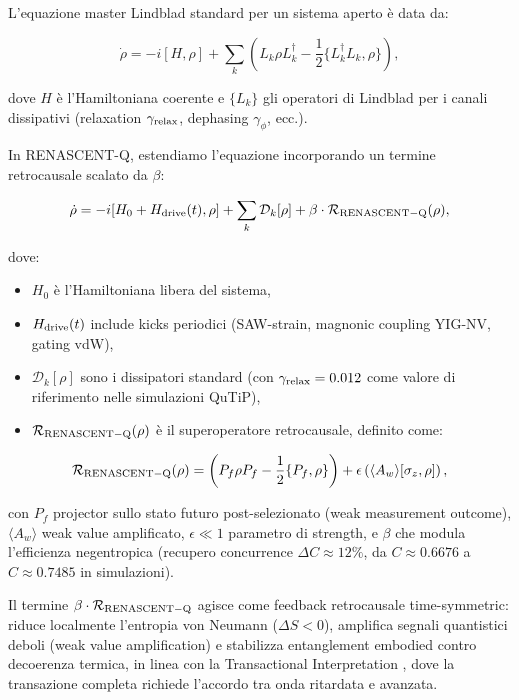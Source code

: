 \documentclass[11pt,a4paper]{article}
\let\oldcite\cite
\renewcommand{\cite}{\protect\oldcite}
\theoremstyle{plain}
\theoremstyle{definition}
\begin{document}
L'equazione master Lindblad standard per un sistema aperto è data da:

\begin{equation}
\dot{\rho} = -i [H, \rho] + \sum_k \left( L_k \rho L_k^\dagger - \frac{1}{2} \{ L_k^\dagger L_k, \rho \} \right),
\label{eq:lindblad_standard}
\end{equation}

dove $H$ è l'Hamiltoniana coerente e $\{L_k\}$ gli operatori di Lindblad per i canali dissipativi (relaxation $\gamma_{\rm relax}$, dephasing $\gamma_\phi$, ecc.).

In RENASCENT-Q, estendiamo l'equazione incorporando un termine retrocausale scalato da $\beta$:

\begin{equation}
\dot{\rho} = -i [H_0 + H_{\rm drive}(t), \rho] + \sum_k \mathcal{D}_k[\rho] + \beta \cdot \mathcal{R}_{\rm RENASCENT-Q}(\rho),
\label{eq:lindblad_renascent}
\end{equation}

dove:
\begin{itemize}
    \item $H_0$ è l'Hamiltoniana libera del sistema,
    \item $H_{\rm drive}(t)$ include kicks periodici (SAW-strain, magnonic coupling YIG-NV, gating vdW),
    \item $\mathcal{D}_k[\rho]$ sono i dissipatori standard (con $\gamma_{\rm relax} = 0.012$ come valore di riferimento nelle simulazioni QuTiP),
    \item $\mathcal{R}_{\rm RENASCENT-Q}(\rho)$ è il superoperatore retrocausale, definito come:
\end{itemize}

\begin{equation}
\mathcal{R}_{\rm RENASCENT-Q}(\rho) = \left( P_f \rho P_f - \frac{1}{2} \{ P_f, \rho \} \right) + \epsilon \left( \langle A_w \rangle [\sigma_z, \rho] \right),
\label{eq:renascent_superop}
\end{equation}

con $P_f$ projector sullo stato futuro post-selezionato (weak measurement outcome), $\langle A_w \rangle$ weak value amplificato, $\epsilon \ll 1$ parametro di strength, e $\beta$ che modula l'efficienza negentropica (recupero concurrence $\Delta C \approx 12\%$, da $C \approx 0.6676$ a $C \approx 0.7485$ in simulazioni).


\vspace{0.3cm}

Il termine $\beta \cdot \mathcal{R}_{\rm RENASCENT-Q}$ agisce come feedback retrocausale time-symmetric: riduce localmente l'entropia von Neumann ($\Delta S < 0$), amplifica segnali quantistici deboli (weak value amplification) e stabilizza entanglement embodied contro decoerenza termica, in linea con la Transactional Interpretation \cite{Cramer2017}, dove la transazione completa richiede l'accordo tra onda ritardata e avanzata.
\end{document}

